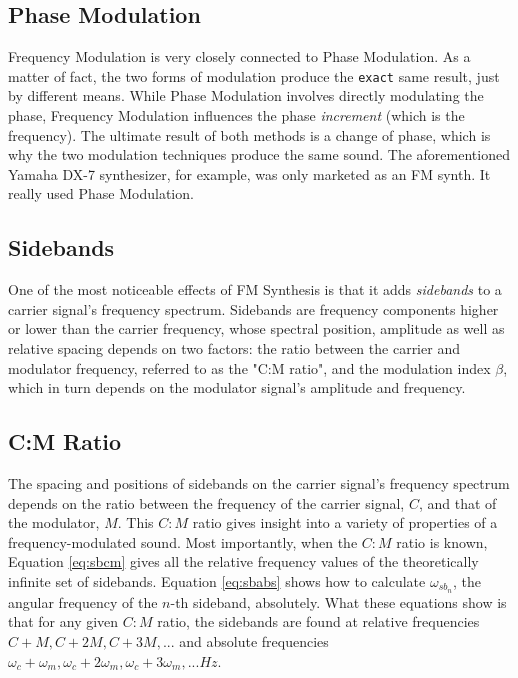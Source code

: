 \documentclass[12pt,twoside]{report}
\begin{document}
\subsection{Phase Modulation}

Frequency Modulation is very closely connected to Phase Modulation. As a matter of fact, the two forms of modulation produce the \texttt{exact} same result, just by different means. While Phase Modulation involves directly modulating the phase, Frequency Modulation influences the phase \emph{increment} (which is the frequency). The ultimate result of both methods is a change of phase, which is why the two modulation techniques produce the same sound. The aforementioned Yamaha DX-7 synthesizer, for example, was only marketed as an FM synth. It really used Phase Modulation.

\subsection{Sidebands}

One of the most noticeable effects of FM Synthesis is that it adds \emph{sidebands} to a carrier signal's frequency spectrum. Sidebands are frequency components higher or lower than the carrier frequency, whose spectral position, amplitude as well as relative spacing depends on two factors: the ratio between the carrier and modulator frequency, referred to as the "C:M ratio", and the modulation index $\beta$, which in turn depends on the modulator signal's amplitude and frequency.

\subsection{C:M Ratio}

The spacing and positions of sidebands on the carrier signal's frequency spectrum depends on the ratio between the frequency of the carrier signal, $C$, and that of the modulator, $M$. This $C:M$ ratio gives insight into a variety of properties of a frequency-modulated sound. Most importantly, when the $C:M$ ratio is known, Equation \ref{eq:sbcm} gives all the relative frequency values of the theoretically infinite set of sidebands. Equation \ref{eq:sbabs} shows how to calculate $\omega_{sb_{n}}$, the angular frequency of the $n$-th sideband, absolutely. What these equations show is that for any given $C:M$ ratio, the sidebands are found at relative frequencies $C + M, C + 2M, C + 3M, ... $ and absolute frequencies %
$\omega_{c} + \omega_{m}, \omega_{c} + 2 \omega_{m},\omega_{c} + 3 \omega_{m}, ... Hz$.
\end{document}
